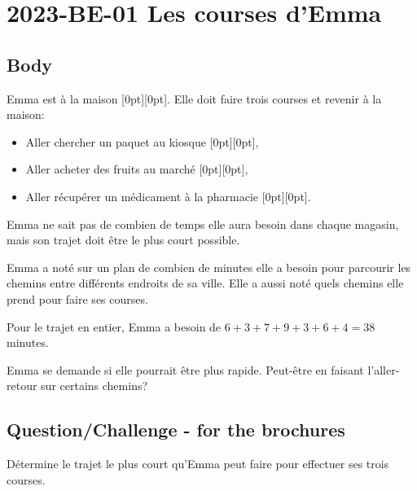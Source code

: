 \documentclass[a4paper,11pt]{report}
\newcommand{\taskGraphicsFolder}{..}
\begin{document}
\section*{\centering{} 2023-BE-01 Les courses d’Emma}


\subsection*{Body}

Emma est à la maison \raisebox{\dimexpr -0.5ex -0.2ex \relax}[0pt][0pt]{}. Elle doit faire trois courses et revenir à la maison:

\begin{itemize}
  \item Aller chercher un paquet au kiosque \raisebox{\dimexpr -0.5ex -0.2ex \relax}[0pt][0pt]{},
  \item Aller acheter des fruits au marché \raisebox{\dimexpr -0.5ex -0.2ex \relax}[0pt][0pt]{},
  \item Aller récupérer un médicament à la pharmacie \raisebox{\dimexpr -0.5ex -0.2ex \relax}[0pt][0pt]{}.
\end{itemize}

Emma ne sait pas de combien de temps elle aura besoin dans chaque magasin, mais son trajet doit être le plus court possible.

Emma a noté sur un plan de combien de minutes elle a besoin pour parcourir les chemins entre différents endroits de sa ville. Elle a aussi noté quels chemins elle prend pour faire ses courses.

Pour le trajet en entier, Emma a besoin de ${6 + 3 + 7 + 9 + 3 + 6 + 4 = 38}$ minutes.

{\centering%
\par}

Emma se demande si elle pourrait être plus rapide. Peut-être en faisant l’aller-retour sur certains chemins?

{\em


\subsection*{Question/Challenge - for the brochures}

Détermine le trajet le plus court qu’Emma peut faire pour effectuer ses trois courses.

{\centering%
\par}

}
\end{document}
